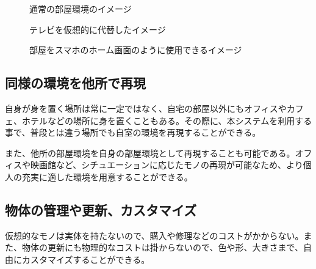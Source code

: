 \begin{figure}[htbp]
    \begin{center}
    \end{center}
    \caption{通常の部屋環境のイメージ}
    \label{fig:normal-room}
\end{figure}

\begin{figure}[htbp]
    \begin{minipage}{0.5\hsize}
      \begin{center}
      \end{center}
      \label{fig:bigTV}
      \caption{テレビを仮想的に代替したイメージ}
    \end{minipage}
    \begin{minipage}{0.5\hsize}
      \begin{center}
      \end{center}
      \caption{部屋をスマホのホーム画面のように使用できるイメージ}
      \label{fig:widget}
    \end{minipage}
\end{figure}


\subsection{同様の環境を他所で再現}

自身が身を置く場所は常に一定ではなく、自宅の部屋以外にもオフィスやカフェ、ホテルなどの場所に身を置くこともある。その際に、本システムを利用する事で、普段とは違う場所でも自室の環境を再現することができる。

また、他所の部屋環境を自身の部屋環境として再現することも可能である。オフィスや映画館など、シチュエーションに応じたモノの再現が可能なため、より個人の充実に適した環境を用意することができる。

\subsection{物体の管理や更新、カスタマイズ}

仮想的なモノは実体を持たないので、購入や修理などのコストがかからない。また、物体の更新にも物理的なコストは掛からないので、色や形、大きさまで、自由にカスタマイズすることができる。

